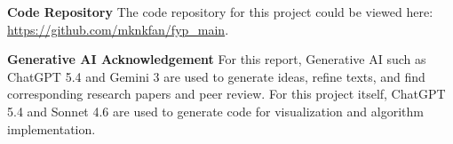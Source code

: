 \documentclass{article}
\begin{document}




\newpage
\printbibliography
\textbf{Code Repository} \newline
The code repository for this project could be viewed here: \url{https://github.com/mknkfan/fyp_main}.

\textbf{Generative AI Acknowledgement} \newline
For this report, Generative AI such as ChatGPT 5.4 and Gemini 3 are used to generate ideas, refine texts, and find corresponding research papers and peer review. For this project itself, ChatGPT 5.4 and Sonnet 4.6 are used to generate code for visualization and algorithm implementation.
\newpage


\end{document}
